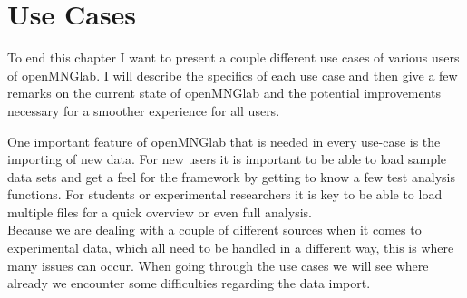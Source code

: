 \section{Use Cases}
To end this chapter I want to present a couple different use cases of various users of openMNGlab. I will describe the specifics of each use case and then give a few remarks on the current state of openMNGlab and the potential improvements necessary for a smoother experience for all users.

One important feature of openMNGlab that is needed in every use-case is the importing of new data. For new users it is important to be able to load sample data sets and get a feel for the framework by getting to know a few test analysis functions. For students or experimental researchers it is key to be able to load multiple files for a quick overview or even full analysis.\\
Because we are dealing with a couple of different sources when it comes to experimental data, which all need to be handled in a different way, this is where many issues can occur. When going through the use cases we will see where already we encounter some difficulties regarding the data import.


